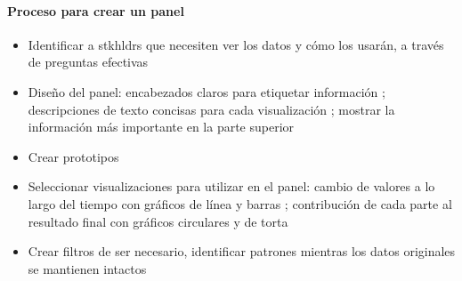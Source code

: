\paragraph{Proceso para crear un panel}
    \begin{itemize}
        \item {Identificar a \Gls{stkhldrs} que necesiten ver los datos y cómo los usarán, a través de preguntas efectivas}
        \item {Diseño del panel: encabezados claros para etiquetar información ; descripciones de texto concisas para cada visualización ; mostrar la información más importante en la parte superior}
        \item {Crear prototipos}
        \item {Seleccionar visualizaciones para utilizar en el panel: cambio de valores a lo largo del tiempo con gráficos de línea y barras ; contribución de cada parte al resultado final con gráficos circulares y de torta}
        \item {Crear filtros de ser necesario, identificar patrones mientras los datos originales se mantienen intactos}
    \end{itemize}
